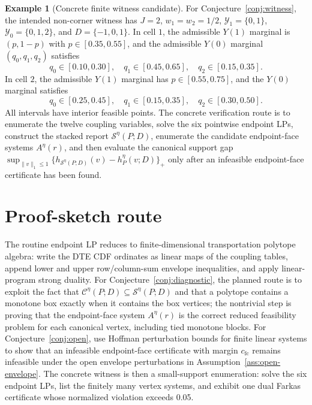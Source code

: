 \documentclass[11pt]{article}
\theoremstyle{definition}
\newtheorem{example}{Example}
\theoremstyle{plain}
\theoremstyle{remark}
\begin{document}
\begin{example}[Concrete finite witness candidate]\label{ex:witness-candidate}
For Conjecture~\ref{conj:witness}, the intended non-corner witness has
\(J=2\), \(w_1=w_2=1/2\), \(\mathcal Y_1=\{0,1\}\),
\(\mathcal Y_0=\{0,1,2\}\), and \(D=\{-1,0,1\}\).  In cell \(1\), the
admissible \(Y(1)\) marginal is \((p,1-p)\) with \(p\in[0.35,0.55]\), and the
admissible \(Y(0)\) marginal \((q_0,q_1,q_2)\) satisfies
\[
q_0\in[0.10,0.30],\quad q_1\in[0.45,0.65],\quad q_2\in[0.15,0.35].
\]
In cell \(2\), the admissible \(Y(1)\) marginal has \(p\in[0.55,0.75]\), and
the \(Y(0)\) marginal satisfies
\[
q_0\in[0.25,0.45],\quad q_1\in[0.15,0.35],\quad q_2\in[0.30,0.50].
\]
All intervals have interior feasible points.  The concrete verification route is
to enumerate the twelve coupling variables, solve the six pointwise endpoint
LPs, construct the stacked report \(\mathcal S^\eta(P;D)\), enumerate the
candidate endpoint-face systems \(A^\eta(r)\), and then evaluate the canonical
support gap
\(\sup_{\|v\|_1\le1}\{h_{\mathcal S^\eta(P;D)}(v)-h^\eta_P(v;D)\}_+\) only after
an infeasible endpoint-face certificate has been found.
\end{example}

\section{Proof-sketch route}
The routine endpoint LP reduces to finite-dimensional transportation polytope
algebra: write the DTE CDF ordinates as linear maps of the coupling tables,
append lower and upper row/column-sum envelope inequalities, and apply
linear-program strong duality.  For Conjecture~\ref{conj:diagnostic}, the planned
route is to exploit the fact that \(\mathcal C^\eta(P;D)\subseteq
\mathcal S^\eta(P;D)\) and that a polytope contains a monotone box exactly when
it contains the box vertices; the nontrivial step is proving that the
endpoint-face system \(A^\eta(r)\) is the correct reduced feasibility problem for
each canonical vertex, including tied monotone blocks.  For
Conjecture~\ref{conj:open}, use Hoffman perturbation bounds for finite linear
systems to show that an infeasible endpoint-face certificate with margin
\(c_{\mathrm{fc}}\) remains infeasible under the open envelope perturbations in
Assumption~\ref{ass:open-envelope}.  The concrete witness is then a small-support
enumeration: solve the six endpoint LPs, list the finitely many vertex systems,
and exhibit one dual Farkas certificate whose normalized violation exceeds
0.05.
\end{document}
